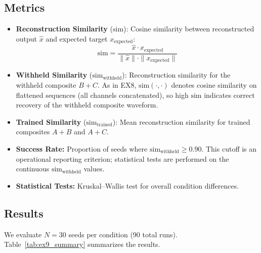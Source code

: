\documentclass{article}
\begin{document}
\subsection{Metrics}
\begin{itemize}
    \item \textbf{Reconstruction Similarity} ($\mathrm{sim}$): Cosine similarity between reconstructed output $\hat{x}$ and expected target $x_{\text{expected}}$:
    \begin{equation}
        \mathrm{sim} = \frac{\hat{x} \cdot x_{\text{expected}}}{\|\hat{x}\| \cdot \|x_{\text{expected}}\|}
    \end{equation}
    \item \textbf{Withheld Similarity} ($\mathrm{sim}_{\text{withheld}}$): Reconstruction similarity for the withheld composite $B{+}C$. As in EX8, $\mathrm{sim}(\cdot,\cdot)$ denotes cosine similarity on flattened sequences (all channels concatenated), so high $\mathrm{sim}$ indicates correct recovery of the withheld composite waveform.

    \item \textbf{Trained Similarity} ($\mathrm{sim}_{\text{trained}}$): Mean reconstruction similarity for trained composites $A{+}B$ and $A{+}C$.
    \item \textbf{Success Rate:} Proportion of seeds where $\mathrm{sim}_{\text{withheld}} \geq 0.90$.
    This cutoff is an operational reporting criterion; statistical tests are performed on the continuous $\mathrm{sim}_{\text{withheld}}$ values.
    \item \textbf{Statistical Tests:} Kruskal--Wallis test for overall condition differences.
\end{itemize}

\subsection{Results}

We evaluate $N = 30$ seeds per condition (90 total runs).
Table~\ref{tab:ex9_summary} summarizes the results.


\end{document}
